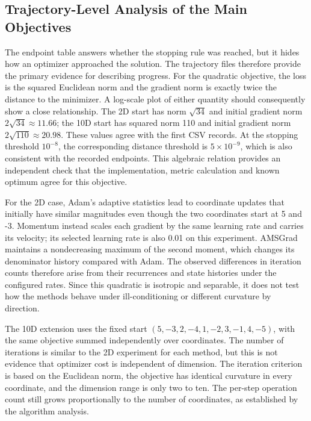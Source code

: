 ﻿\documentclass[conference]{IEEEtran}
\begin{document}
\subsection{Trajectory-Level Analysis of the Main Objectives}
The endpoint table answers whether the stopping rule was reached, but it hides how an optimizer approached the solution. The trajectory files therefore provide the primary evidence for describing progress. For the quadratic objective, the loss is the squared Euclidean norm and the gradient norm is exactly twice the distance to the minimizer. A log-scale plot of either quantity should consequently show a close relationship. The 2D start has norm $\sqrt{34}$ and initial gradient norm $2\sqrt{34}\approx11.66$; the 10D start has squared norm 110 and initial gradient norm $2\sqrt{110}\approx20.98$. These values agree with the first CSV records. At the stopping threshold $10^{-8}$, the corresponding distance threshold is $5\times10^{-9}$, which is also consistent with the recorded endpoints. This algebraic relation provides an independent check that the implementation, metric calculation and known optimum agree for this objective.

For the 2D case, Adam's adaptive statistics lead to coordinate updates that initially have similar magnitudes even though the two coordinates start at 5 and -3. Momentum instead scales each gradient by the same learning rate and carries its velocity; its selected learning rate is also 0.01 on this experiment. AMSGrad maintains a nondecreasing maximum of the second moment, which changes its denominator history compared with Adam. The observed differences in iteration counts therefore arise from their recurrences and state histories under the configured rates. Since this quadratic is isotropic and separable, it does not test how the methods behave under ill-conditioning or different curvature by direction.

The 10D extension uses the fixed start $(5,-3,2,-4,1,-2,3,-1,4,-5)$, with the same objective summed independently over coordinates. The number of iterations is similar to the 2D experiment for each method, but this is not evidence that optimizer cost is independent of dimension. The iteration criterion is based on the Euclidean norm, the objective has identical curvature in every coordinate, and the dimension range is only two to ten. The per-step operation count still grows proportionally to the number of coordinates, as established by the algorithm analysis.
\end{document}
